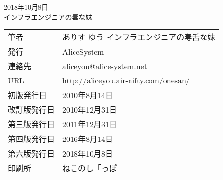 \begin{flushright}
2018年10月8日 \\
インフラエンジニアの毒な妹 \\
\end{flushright}



\thispagestyle{empty}
\mbox{}
\newpage
\clearpage


\thispagestyle{empty}

\vspace*{\fill}
\begin{tabular}{ll} \toprule
筆者 & ありす ゆう インフラエンジニアの毒舌な妹 \\
発行 & AliceSystem \\
連絡先 & aliceyou@alicesystem.net \\
URL & http://aliceyou.air-nifty.com/onesan/ \\
初版発行日 & 2010年8月14日 \\
改訂版発行日 & 2010年12月31日 \\
第三版発行日 & 2011年12月31日 \\
第四版発行日 & 2016年8月14日 \\
第六版発行日 & 2018年10月8日 \\
印刷所 & ねこのし「っぽ \\ \bottomrule
\end{tabular}